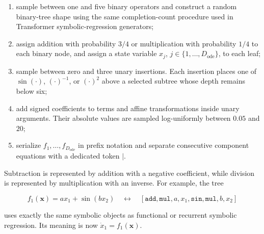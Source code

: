 \begin{enumerate}
    \item sample between one and five binary operators and construct a random
    binary-tree shape using the same completion-count procedure used in
    Transformer symbolic-regression generators;

    \item assign addition with probability $3/4$ or multiplication with
    probability $1/4$ to each binary node, and assign a state variable
    $x_j$, $j\in\{1,\ldots,D_{\mathrm{ode}}\}$, to each leaf;

    \item sample between zero and three unary insertions. Each insertion places
    one of $\sin(\cdot)$, $(\cdot)^{-1}$, or $(\cdot)^2$ above a selected
    subtree whose depth remains below six;

    \item add signed coefficients to terms and affine transformations inside
    unary arguments. Their absolute values are sampled log-uniformly between
    $0.05$ and $20$;

    \item serialize $f_1,\ldots,f_{D_{\mathrm{ode}}}$ in prefix notation and
    separate consecutive component equations with a dedicated token
    $\texttt{|}$.
\end{enumerate}

Subtraction is represented by addition with a negative coefficient, while
division is represented by multiplication with an inverse. For example, the
tree

\begin{equation}
f_1(\mathbf x)=a x_1+\sin(bx_2)
\quad\longleftrightarrow\quad
[\texttt{add},\texttt{mul},a,x_1,
  \texttt{sin},\texttt{mul},b,x_2]
\label{eq:odeformer-prefix-example}
\end{equation}

uses exactly the same symbolic objects as functional or recurrent symbolic
regression. Its meaning is now $\dot x_1=f_1(\mathbf x)$.

